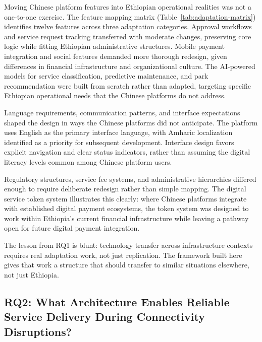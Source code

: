 Moving Chinese platform features into Ethiopian operational realities was not a one-to-one exercise. The feature mapping matrix (Table~\ref{tab:adaptation-matrix}) identifies twelve features across three adaptation categories. Approval workflows and service request tracking transferred with moderate changes, preserving core logic while fitting Ethiopian administrative structures. Mobile payment integration and social features demanded more thorough redesign, given differences in financial infrastructure and organizational culture. The AI-powered models for service classification, predictive maintenance, and park recommendation were built from scratch rather than adapted, targeting specific Ethiopian operational needs that the Chinese platforms do not address.

Language requirements, communication patterns, and interface expectations shaped the design in ways the Chinese platforms did not anticipate. The platform uses English as the primary interface language, with Amharic localization identified as a priority for subsequent development. Interface design favors explicit navigation and clear status indicators, rather than assuming the digital literacy levels common among Chinese platform users.

Regulatory structures, service fee systems, and administrative hierarchies differed enough to require deliberate redesign rather than simple mapping. The digital service token system illustrates this clearly: where Chinese platforms integrate with established digital payment ecosystems, the token system was designed to work within Ethiopia's current financial infrastructure while leaving a pathway open for future digital payment integration.

The lesson from RQ1 is blunt: technology transfer across infrastructure contexts requires real adaptation work, not just replication. The framework built here gives that work a structure that should transfer to similar situations elsewhere, not just Ethiopia.

\subsection{RQ2: What Architecture Enables Reliable Service Delivery During Connectivity Disruptions?}

